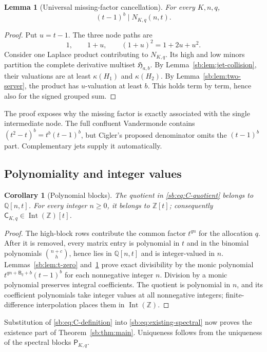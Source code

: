 \documentclass[11pt]{article}
\newtheorem{lemma}[theorem]{Lemma}
\newtheorem{corollary}[theorem]{Corollary}
\theoremstyle{definition}
\theoremstyle{remark}
\newcommand{\Z}{\mathbb Z}
\newcommand{\Q}{\mathbb Q}
\newcommand{\IntZ}{\operatorname{Int}(\Z)}
\newcommand{\Cblock}{\mathsf C}
\newcommand{\Pblock}{\mathsf P}
\newcommand{\Btri}{\mathsf B}
\theoremstyle{definition}
\theoremstyle{plain}
\numberwithin{equation}{section}
\begin{document}
\begin{lemma}[Universal missing-factor cancellation]
\label{sb:lem:t-one}
For every $K,n,q$,
\[
 (t-1)^b\mid N_{K,q}(n,t).
\]
\end{lemma}

\begin{proof}
Put $u=t-1$.  The three node paths are
\[
 1,\qquad 1+u,\qquad (1+u)^2=1+2u+u^2.
\]
Consider one Laplace product contributing to $N_{K,q}$.  Its high and low
minors partition the complete derivative multiset
$\mathfrak H_{a,b}$.  By Lemma~\ref{sb:lem:jet-collision}, their valuations are at
least $\kappa(H_1)$ and $\kappa(H_2)$.  By Lemma~\ref{sb:lem:two-server}, the product
has $u$-valuation at least $b$.  This holds term by term, hence also for the
signed grouped sum.
\end{proof}

The proof exposes why the missing factor is exactly associated with the
single intermediate node.  The full confluent Vandermonde contains
$(t^2-t)^b=t^b(t-1)^b$, but Cigler's proposed denominator omits the
$(t-1)^b$ part.  Complementary jets supply it automatically.

\subsection{Polynomiality and integer values}

\begin{corollary}[Polynomial blocks]
\label{sb:cor:polynomiality}
The quotient in \eqref{sb:eq:C-quotient} belongs to $\Q[n,t]$.  For every
integer $n\ge0$, it belongs to $\Z[t]$; consequently
$\Cblock_{K,q}\in\IntZ[t]$.
\end{corollary}

\begin{proof}
The high-block rows contribute the common factor $t^{qn}$ for the allocation
$q$.  After it is removed, every matrix entry is polynomial in $t$ and in the
binomial polynomials $\binom{n+c}{h}$, hence lies in $\Q[n,t]$ and is
integer-valued in $n$.  Lemmas~\ref{sb:lem:t-zero} and~\ref{sb:lem:t-one} prove
exact divisibility by the monic polynomial
$t^{qn+\Btri_q+b}(t-1)^b$ for each nonnegative integer $n$.  Division by a
monic polynomial preserves integral coefficients.  The quotient is
polynomial in $n$, and its coefficient polynomials take integer values at
all nonnegative integers; finite-difference interpolation places them in
$\IntZ$.
\end{proof}

Substitution of \eqref{sb:eq:C-definition} into
\eqref{sb:eq:existing-spectral} now proves the existence part of
Theorem~\ref{sb:thm:main}.  Uniqueness follows from the uniqueness of the spectral
blocks $\Pblock_{K,q}$.
\end{document}
